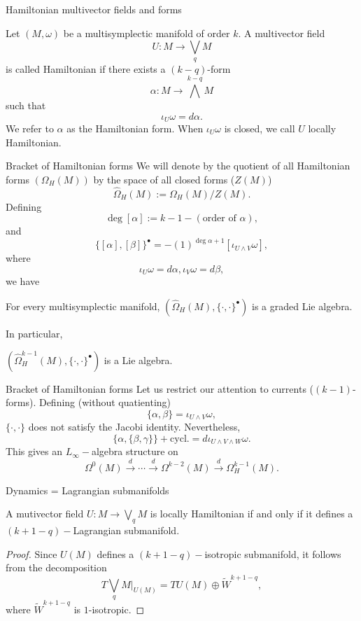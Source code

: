\begin{frame}{Hamiltonian multivector fields and forms}
\begin{definition} Let $(M, \omega)$ be a multisymplectic manifold of order $k.$ A multivector field $$U: M \rightarrow \bigvee_q M$$ is called \alert{Hamiltonian} if there exists a $(k-q)$-form $$\alpha: M \rightarrow \bigwedge^{k-q} M$$ such that $$\iota_U \omega = d \alpha.$$ We refer to $\alpha$ as the \alert{Hamiltonian form.} When $\iota_U \omega$ is closed, we call $U$ \alert{locally Hamiltonian}.
\end{definition}
\end{frame}

\begin{frame}{Bracket of Hamiltonian forms}
We will denote by the quotient of all Hamiltonian forms $(\Omega_H(M))$ by the space of all closed forms ($Z(M)$) $$\widehat{\Omega}_H(M) := \Omega_H(M)/Z(M).$$
\pause
Defining $$\deg [\alpha] := k - 1 - (\text{order of }\alpha),$$ and $$\{[\alpha], [\beta]\}^\bullet = -(1)^{\deg \alpha +1 }[\iota_{U \wedge V} \omega],$$ where $$\iota_ U \omega = d \alpha, \iota_V \omega = d \beta,$$
we have 
\pause
\begin{theorem}
     For every multisymplectic manifold, $(\widehat{\Omega}_H(M), \{\cdot, \cdot\}^\bullet)$ is a graded Lie algebra. 
\end{theorem}
In particular,
\begin{proposition} $(\widehat{\Omega}^{k-1}_H(M), \{\cdot, \cdot\}^\bullet)$ is a Lie algebra.
\end{proposition}
\end{frame}

\begin{frame}{Bracket of Hamiltonian forms}
    Let us restrict our attention to \alert{currents} ($(k-1)$-forms). Defining (without quatienting) $$\{\alpha, \beta\} = \iota_{U \wedge V}\omega,$$ $\{ \cdot , \cdot \}$ does not satisfy the Jacobi identity. \pause 
   Nevertheless, $$\{\alpha, \{\beta, \gamma\}\} + \text{cycl.} = d \iota_{U \wedge V \wedge W} \omega.$$
 This gives an $L_\infty-$algebra structure on $$\Omega^0(M) \xrightarrow{d} \cdots \xrightarrow{d} \Omega^{k-2}(M) \xrightarrow{d} \Omega^{k-1}_H(M).$$
\end{frame}


\begin{frame}{Dynamics = Lagrangian submanifolds}
\begin{theorem} A mutivector field $U: M \rightarrow \bigvee_q M$ is locally Hamiltonian if and only if it defines a $(k+1-q)-$Lagrangian submanifold.
\end{theorem}
\pause
\begin{proof}
Since $U(M)$ defines a $(k+1-q)-$isotropic submanifold, it follows from the decomposition $$T \bigvee_q M \bigg |_{U(M)} = T U(M)  \oplus \widetilde W^{k+1-q},$$ where $\widetilde{W}^{k+1-q}$ is $1$-isotropic.
\end{proof}
\end{frame}
